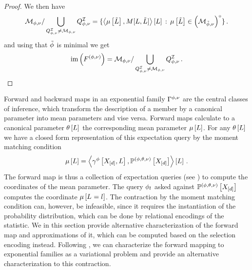 \begin{proof}
    We then have %
    \begin{align*}
        \mathcal{M}_{\phi,\nu} / \bigcup_{Q^{\mathcal{I}}_{\phi,\nu}\neq\mathcal{M}_{\phi,\nu}} Q^{\mathcal{I}}_{\phi,\nu}
        = \{\left\langle \mu\left[\tilde{L}\right],M[L,\tilde{L}]\right\rangle \left[ L \right]\,:\,\mu\left[\tilde{L}\right]\in{\left(\mathcal{M}_{\tilde{\phi},\nu}\right)}^{\circ}\} \, .
    \end{align*}
    and using that $\tilde{\phi}$ is minimal we get
    \begin{align*}
        \mathrm{im}\left(F^{(\phi,\nu)}\right) = \mathcal{M}_{\phi,\nu} / \bigcup_{Q^{\mathcal{I}}_{\phi,\nu}\neq\mathcal{M}_{\phi,\nu}} Q^{\mathcal{I}}_{\phi,\nu} \, .
    \end{align*}
\end{proof}



Forward and backward maps in an exponential family $\Gamma^{\phi,\nu}$ are the central classes of inference, which transform the description of a member by a canonical parameter into mean parameters and vise versa.
Forward maps calculate to a canonical parameter $\theta\left[L\right]$ the corresponding mean parameter $\mu\left[L\right]$.
For any $\theta\left[L\right]$ we have a closed form representation of this expectation query by the moment matching condition
\begin{align*}
    \mu\left[L\right] = \left\langle \gamma^{\phi}\left[X_{[d]},L\right],\mathbb{P}^{(\phi,\theta,\nu)}\left[X_{[d]}\right]\right\rangle \left[ L \right] \, .
\end{align*}
The forward map is thus a collection of expectation queries (see ) to compute the coordinates of the mean parameter.
The query $\phi_{l}$ asked against $\mathbb{P}^{(\phi,\theta,\nu)}\left[X_{[d]}\right]$ computes the coordinate $\mu\left[L_{}=l_{}\right]$.
The contraction by the moment matching condition can, however, be infeasible, since it requires the instantiation of the probability distribution, which can be done by relational encodings of the statistic.
We in this section provide alternative characterization of the forward map and approximations of it, which can be computed based on the selection encoding instead.
Following \cite{wainwright_graphical_2008}, we can characterize the forward mapping to exponential families as a variational problem and provide an alternative characterization to this contraction.


